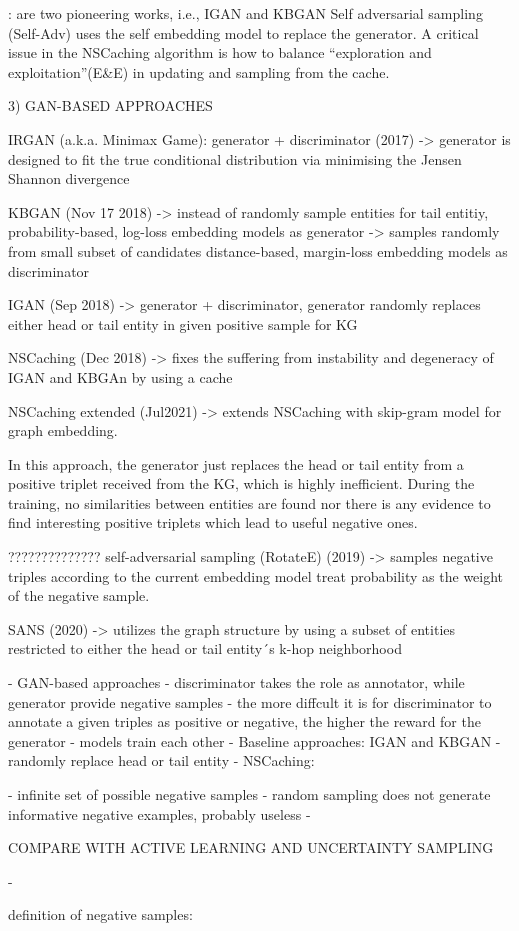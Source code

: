 \cite{zhang2021efficient}:
are two pioneering works, i.e., IGAN  and KBGAN
Self adversarial sampling (Self-Adv)  uses the
self embedding model to replace the generator. 
A critical issue in the NSCaching algorithm is how to
balance “exploration and exploitation”(E&E) in updating
and sampling from the cache.

3) GAN-BASED APPROACHES
    
    IRGAN (a.k.a. Minimax Game): generator + discriminator  (2017) 
        -> generator is designed to fit the true conditional distribution via minimising the Jensen Shannon divergence
    
    KBGAN (Nov 17 2018)
        -> instead of randomly sample entities for tail entitiy,
        probability-based, log-loss embedding models as generator
        -> samples randomly from small subset of candidates
        distance-based, margin-loss embedding models as discriminator
    
    IGAN (Sep 2018) 
        -> generator + discriminator, generator randomly replaces either head or tail entity in given positive sample for KG
    
    NSCaching (Dec 2018)
        -> fixes the suffering from instability and degeneracy of IGAN and KBGAn by using a cache

    NSCaching extended (Jul2021)
        ->  extends NSCaching with skip-gram model for graph embedding. 
    
    
    
In this approach, the generator just replaces the head or tail entity from a positive triplet received from the \ac{KG}, which is highly inefficient.
    During the training, no similarities between entities are found nor there is any evidence to find interesting positive triplets which lead to useful negative ones.
    
??????????????
    self-adversarial sampling (RotateE) (2019)
    -> samples negative triples according to the current embedding model
    treat probability as the weight of the negative sample.

    SANS (2020)
    -> utilizes the graph structure by using a subset of entities restricted to either the head or tail entity´s k-hop neighborhood






- GAN-based approaches
- discriminator takes the role as annotator, while generator provide negative samples
- the more diffcult it is for discriminator to annotate a given triples as positive or negative, the higher the reward for the generator
- models train each other
- Baseline approaches: IGAN and KBGAN
- randomly replace head or tail entity
- NSCaching: 

- infinite set of possible negative samples
- random sampling does not generate informative negative examples, probably useless
- 


COMPARE WITH ACTIVE LEARNING AND UNCERTAINTY SAMPLING



\cite{safavi2021negater}
- 


\cite{zhang2021efficient}





definition of negative samples:
